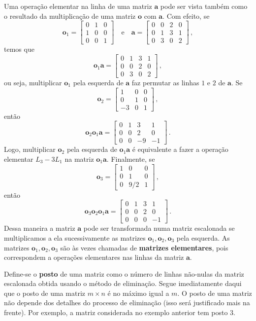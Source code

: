 \documentclass[12pt,a4paper]{report}
\newcommand{\mb}{\mathbf}
\begin{document}
Uma operação elementar na linha de uma matriz $\mb a$ pode ser vista também como o resultado da multiplicação de uma matriz $\mb o$ com $\mb a$. Com efeito, se
$$\mb{o}_1=\begin{bmatrix}
  0&1&0\\
  1&0&0\\
  0&0&1
\end{bmatrix}\quad\text{e}\quad \mb a=\begin{bmatrix}
  0&0&2&0\\
  0&1&3&1\\
  0&3&0&2
\end{bmatrix}\,,$$
temos que
$$\mb{o}_1\mb a=\begin{bmatrix}
  0&1&3&1\\
  0&0&2&0\\
  0&3&0&2
\end{bmatrix}\,,$$
ou seja, multiplicar $\mb o_1$ pela esquerda de $\mb a$ faz permutar as linhas $1$ e $2$ de $\mb a$. Se
$$\mb o_2=\begin{bmatrix}
  1&0&0\\
  0&1&0\\
  -3&0&1
\end{bmatrix}\,,$$
então
$$\mb o_2\mb o_1\mb a=\begin{bmatrix}
  0&1&3&1\\
  0&0&2&0\\
  0&0&-9&-1
\end{bmatrix}\,.$$
Logo, multiplicar $\mb o_2$ pela esquerda de $\mb o_1\mb a$ é equivalente a fazer a operação elementar $L_3-3L_1$ na matriz $\mb o_1\mb a$. Finalmente, se
$$\mb o_3=\begin{bmatrix}
  1&0&0\\
  0&1&0\\
  0&9/2&1
\end{bmatrix}\,,$$
então
$$\mb o_3\mb o_2\mb o_1\mb a=\begin{bmatrix}
  0&1&3&1\\
  0&0&2&0\\
  0&0&0&-1
\end{bmatrix}\,.$$
Dessa maneira a matriz $\mb a$ pode ser transformada numa matriz escalonada se multiplicamos a ela sucessivamente as matrizes $\mb o_1,\mb o_2,\mb o_3$ pela esquerda. As matrizes $\mb o_1,\mb o_2,\mb o_3$ são às vezes chamadas de \textbf{matrizes elementares}, pois correspondem a operações elementares nas linhas da matriz $\mb a$.

Define-se o \textbf{posto} de uma matriz como o número de linhas não-nulas da matriz escalonada obtida usando o método de eliminação. Segue imediatamente daqui que o posto de uma matriz $m\times n$ é no máximo igual a $m$. O posto de uma matriz não depende dos detalhes do processo de eliminação (isso será justificado mais na frente). Por exemplo, a matriz considerada no exemplo anterior tem posto $3$.
\end{document}
